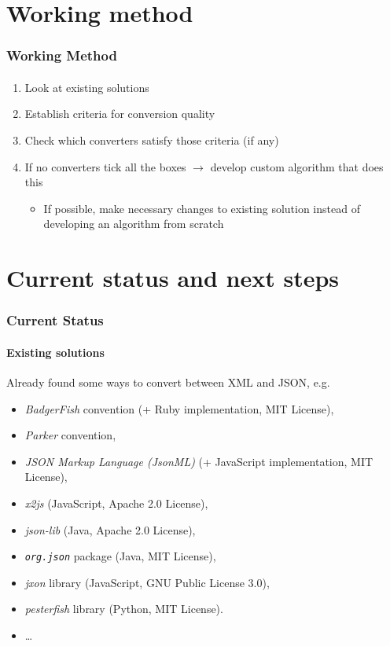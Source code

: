 \documentclass[
    alternativetitlepage=bild,
    cornerlogo=hgi_nds_logo2,
    sectionoverview,
]{rubpresentation}
\begin{document}
\section{Working method}

\begin{frame}[plain]
    \frametitle{Working Method}
    \framesubtitle{}
    \begin{enumerate}
        \item{} Look at existing solutions
        \item{} Establish criteria for conversion quality
        \item{} Check which converters satisfy those criteria (if any)
        \item{} If no converters tick all the boxes $\rightarrow$ develop custom algorithm that does this
            \begin{itemize}
                \item{} If possible, make necessary changes to existing solution instead of developing an algorithm from scratch
            \end{itemize}
    \end{enumerate}
\end{frame}

\section{Current status and next steps}

\begin{frame}[plain]
    \frametitle{Current Status}
    \framesubtitle{Existing solutions}
    Already found some ways to convert between XML and JSON, e.g.
    \begin{itemize}
        \item{} \emph{BadgerFish} convention (+ Ruby implementation, MIT License),
        \item{} \emph{Parker} convention,
        \item{} \emph{JSON Markup Language (JsonML)} (+ JavaScript implementation, MIT License),
        \item{} \emph{x2js} (JavaScript, Apache 2.0 License),
        \item{} \emph{json-lib} (Java, Apache 2.0 License),
        \item{} \emph{\texttt{org.json}} package (Java, MIT License),
        \item{} \emph{jxon} library (JavaScript, GNU Public License 3.0),
        \item{} \emph{pesterfish} library (Python, MIT License).
        \item{} \dots
    \end{itemize}
\end{frame}
\end{document}
